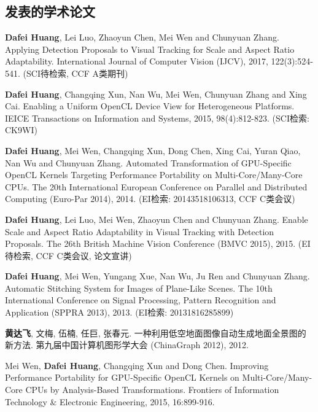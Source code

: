 \begin{resume}

  \section*{发表的学术论文} %

  \begin{enumerate}[{[}1{]}]
  \addtolength{\itemsep}{-.36\baselineskip}%
  \item \textbf{Dafei Huang}, Lei Luo, Zhaoyun Chen, Mei Wen and Chunyuan Zhang. 
  Applying Detection Proposals to Visual Tracking for Scale and Aspect Ratio Adaptability. 
  International Journal of Computer Vision (IJCV), 2017, 122(3):524-541.
  (SCI待检索, CCF A类期刊)
  \item \textbf{Dafei Huang}, Changqing Xun, Nan Wu, Mei Wen, Chunyuan Zhang and Xing Cai.
  Enabling a Uniform OpenCL Device View for Heterogeneous Platforms.
  IEICE Transactions on Information and Systems, 2015, 98(4):812-823.
  (SCI检索: CK9WI)
  \item \textbf{Dafei Huang}, Mei Wen, Changqing Xun, Dong Chen, Xing Cai, Yuran Qiao, Nan Wu and Chunyuan Zhang.
  Automated Transformation of GPU-Specific OpenCL Kernels Targeting Performance Portability on Multi-Core/Many-Core CPUs.
  The 20th International European Conference on Parallel and Distributed Computing (Euro-Par 2014), 2014.
  (EI检索: 20143518106313, CCF C类会议)
  \item \textbf{Dafei Huang}, Lei Luo, Mei Wen, Zhaoyun Chen and Chunyuan Zhang.
  Enable Scale and Aspect Ratio Adaptability in Visual Tracking with Detection Proposals.
  The 26th British Machine Vision Conference (BMVC 2015), 2015.
  (EI待检索, CCF C类会议, 论文宣讲)
  \item \textbf{Dafei Huang}, Mei Wen, Yungang Xue, Nan Wu, Ju Ren and Chunyuan Zhang.
  Automatic Stitching System for Images of Plane-Like Scenes.
  The 10th International Conference on Signal Processing, Pattern Recognition and Application (SPPRA 2013), 2013.
  (EI检索: 20131816285899)
  \item \textbf{黄达飞}, 文梅, 伍楠, 任巨, 张春元. 
  一种利用低空地面图像自动生成地面全景图的新方法. 
  第九届中国计算机图形学大会 (ChinaGraph 2012), 2012.
  \item Mei Wen, \textbf{Dafei Huang}, Changqing Xun and Dong Chen.
  Improving Performance Portability for GPU-Specific OpenCL Kernels on Multi-Core/Many-Core CPUs by Analysis-Based
  Transformations.
  Frontiers of Information Technology \& Electronic Engineering, 2015, 16:899-916.

\end{enumerate}
\end{resume}
